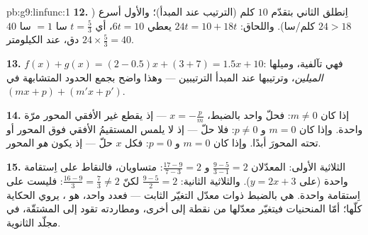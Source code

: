\begin{solution}{pb:g9:linfunc:1}
\textbf{12.} اِنطلق الثاني بتقدّم $10$ كلم (الترتيب عند المبدأ)؛
والأول أسرع ($24 > 18$ كلم/سا). واللحاق:
$24t = 10 + 18t$ يعطي $6t = 10$، أي $t = \frac53$ سا $= 1$ سا $40$
دق، عند الكيلومتر $24 \times \frac53 = 40$.

\textbf{13.} $f(x) + g(x) = (2 - 0.5)x + (3 + 7) = 1.5x + 10$:
فهي تآلفية، وميلها \emph{ الميلين}، وترتيبها عند
المبدأ  الترتيبين --- وهذا واضح بجمع الحدود المتشابهة في
$(mx + p) + (m'x + p')$.

\textbf{14.} إذا كان $m \neq 0$: فحلّ واحد بالضبط،
$x = -\frac pm$ --- إذ يقطع  غير الأفقي المحور مرّة
واحدة. وإذا كان $m = 0$ و $p \neq 0$: فلا حلّ --- إذ لا يلمس
المستقيمُ الأفقي فوق المحور أو تحته المحورَ أبدًا. وإذا كان
$m = 0$ و $p = 0$: فكل $x$ حلّ --- إذ يكون  \emph{هو}
المحور.

\textbf{15.} الثلاثية الأولى: المعدّلان $\frac{9 - 5}{3 - 1} = 2$
و $\frac{17 - 9}{7 - 3} = 2$: متساويان، فالنقاط على اِستقامة
واحدة (على $y = 2x + 3$). والثلاثية الثانية: $\frac{9-5}{2} = 2$
لكنّ $\frac{16 - 9}{3} = \frac73 \neq 2$: فليست على اِستقامة
واحدة.  هي بالضبط ذوات معدّل التغيّر الثابت ---
فعدد واحد، هو ، يروي الحكاية كلّها؛ أمّا المنحنيات
فيتغيّر معدّلها من نقطة إلى أخرى، ومطاردته تقود إلى المشتقّة، في
مجلّد الثانوية.
\end{solution}
